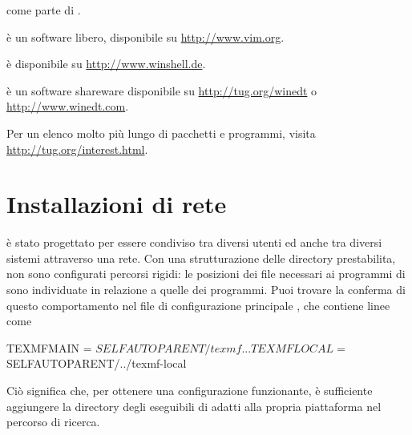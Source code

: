 \documentclass{article}
\begin{document}
\begin{description}
\begin{itemize*}
        come parte di \TL.
  \item {} è un software libero, disponibile su
        \url{http://www.vim.org}.
  \item {} è disponibile su \url{http://www.winshell.de}.
  \item {} è un software shareware disponibile su
        \url{http://tug.org/winedt} o \url{http://www.winedt.com}.
  \end{itemize*}
\end{description}
Per un elenco molto più lungo di pacchetti e programmi, visita
\url{http://tug.org/interest.html}.


\section{Installazioni di rete}
\label{sec:netinstall}

\TL{} è stato progettato per essere condiviso tra diversi utenti ed anche
tra diversi sistemi attraverso una rete. Con una strutturazione delle
directory prestabilita, non sono configurati percorsi rigidi: le posizioni
dei file necessari ai programmi di \TL{} sono individuate in relazione a
quelle dei programmi. Puoi trovare la conferma di questo comportamento nel
file di configurazione principale ,
che contiene linee come
\begin{sverbatim}
TEXMFMAIN = $SELFAUTOPARENT/texmf
...
TEXMFLOCAL = $SELFAUTOPARENT/../texmf-local
\end{sverbatim}
Ciò significa che, per ottenere una configurazione funzionante, è
sufficiente aggiungere la directory degli eseguibili di \TL{} adatti
alla propria piattaforma nel percorso di ricerca.
\end{document}
